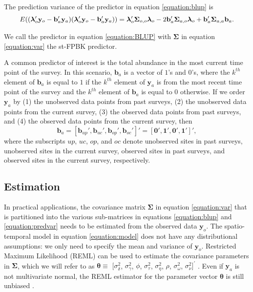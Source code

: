 \documentclass[]{interact}
\theoremstyle{plain}%
\theoremstyle{definition}
\theoremstyle{remark}
\begin{document}
The prediction variance of the predictor in equation \ref{equation:blup}
is \mbox{} \begin{equation} \label{equation:predvar}
E((\bm{\lambda}_o'\mathbf{y}_o - \mathbf{b}_a'\mathbf{y}_a)(\bm{\lambda}_o'\mathbf{y}_o - \mathbf{b}_a'\mathbf{y}_a)) = \\
\bm{\lambda}_o'\bm{\Sigma}_{o, o}\bm{\lambda}_o - 2 \mathbf{b}_a' \bm{\Sigma}_{a, o} \bm{\lambda}_o + \mathbf{b}_a' \bm{\Sigma}_{a, a} \mathbf{b}_a.
\end{equation}

We call the predictor in equation \ref{equation:BLUP} with
\(\bm{\Sigma}\) in equation \ref{equation:var} the st-FPBK predictor.

A common predictor of interest is the total abundance in the most
current time point of the survey. In this scenario, \(\mathbf{b}_a\) is
a vector of \(1\)'s and \(0\)'s, where the \(k^{th}\) element of
\(\mathbf{b}_a\) is equal to \(1\) if the \(k^{th}\) element of
\(\mathbf{y}_a\) is from the most recent time point of the survey and
the \(k^{th}\) element of \(\mathbf{b}_a\) is equal to 0 otherwise. If
we order \(\mathbf{y}_a\) by (1) the unobserved data points from past
surveys, (2) the unobserved data points from the current survey, (3) the
observed data points from past surveys, and (4) the observed data points
from the current survey, then \mbox{}
\begin{equation} \label{equation:currentweights}
\mathbf{b}_a = [\mathbf{b}_{up}', \mathbf{b}_{uc}', \mathbf{b}_{op}', \mathbf{b}_{oc}']' = [\mathbf{0}', \mathbf{1}', \mathbf{0}', \mathbf{1}']',
\end{equation} \noindent where the subscripts \(up\), \(uc\), \(op\),
and \(oc\) denote unobserved sites in past surveys, unobserved sites in
the current survey, observed sites in past surveys, and observed sites
in the current survey, respectively.

\subsection{Estimation}

In practical applications, the covariance matrix \(\bm{\Sigma}\) in
equation \ref{equation:var} that is partitioned into the various
sub-matrices in equations \ref{equation:blup} and \ref{equation:predvar}
needs to be estimated from the observed data \(\mathbf{y}_o\). The
spatio-temporal model in equation \ref{equation:model} does not have any
distributional assumptions: we only need to specify the mean and
variance of \(\mathbf{y}_o\). Restricted Maximum Likelihood (REML) can
be used to estimate the covariance parameters in \(\bm{\Sigma}\), which
we will refer to as \(\bm{\theta} \equiv\) \([\sigma^2_{\delta}\),
\(\sigma^2_{\gamma}\), \(\phi\), \(\sigma^2_{\tau}\),
\(\sigma^2_{\eta}\), \(\rho\), \(\sigma^2_{\omega}\),
\(\sigma^2_{\nu}]^\prime\)
\citep{patterson1971recovery, harville1977maximum}. Even if
\(\mathbf{y}_a\) is not multivariate normal, the REML estimator for the
parameter vector \(\bm{\theta}\) is still unbiased
\citep{heyde1994quasi, cressie1993asymptotic}.
\end{document}
